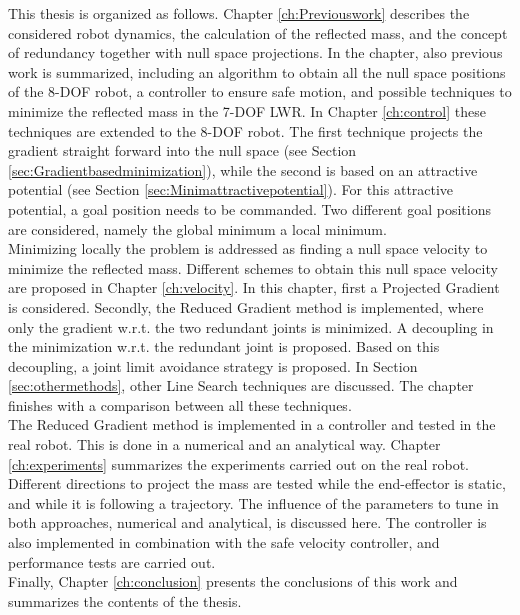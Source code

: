 This thesis is organized as follows. Chapter \ref{ch:Previouswork} describes the considered robot dynamics, the calculation of the reflected mass, and the concept of redundancy together with null space projections. In the chapter, also previous work is summarized, including an algorithm to obtain all the null space positions of the 8-DOF robot, a controller to ensure safe motion, and possible techniques to minimize the reflected mass in the 7-DOF LWR. In Chapter   \ref{ch:control}  these techniques are extended  to the 8-DOF robot. The first technique projects the gradient straight forward into the null space (see Section \ref{sec:Gradientbasedminimization}), while the second is based on an attractive potential (see Section \ref{sec:Minimattractivepotential}).  For this attractive potential, a goal position needs to be commanded. Two different goal positions are considered, namely the global minimum a local minimum.  \\
Minimizing locally the problem is addressed as finding a null space velocity to minimize the reflected mass. Different schemes to obtain this null space velocity are proposed in Chapter \ref{ch:velocity}. In this chapter, first a Projected Gradient is considered.
Secondly, the Reduced Gradient method is implemented, where only the gradient w.r.t.  the two redundant joints is minimized. A decoupling in the minimization w.r.t. the redundant joint is proposed. Based on this decoupling, a joint limit avoidance strategy is proposed.
In Section \ref{sec:othermethods}, other Line Search techniques are discussed. The chapter finishes with a comparison between all these techniques.\\
The Reduced Gradient method is implemented in a controller and tested in the real robot. This is done in a numerical and an analytical way. Chapter \ref{ch:experiments} summarizes the experiments carried out on the real robot. Different directions to project the mass are tested while the end-effector is static, and while it is following a trajectory. The influence of the parameters to tune in both approaches, numerical and analytical, is discussed here.  The controller is also implemented in combination with the safe velocity controller, and performance tests are carried out. \\
Finally, Chapter \ref{ch:conclusion} presents the conclusions of this work and summarizes the contents of the thesis.





